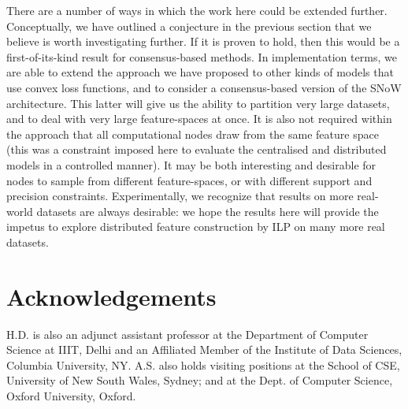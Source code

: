 There are a number of ways in which the work here could be extended further.
Conceptually, we have outlined a conjecture in the previous section
that we believe is worth investigating further. If it is proven to hold, then
this would be a first-of-its-kind result for consensus-based methods. In implementation
terms, we are able to extend the approach we have proposed to other kinds of models
that use convex loss functions, and to consider a consensus-based version of the
SNoW architecture. This latter will give us the ability to partition very large datasets,
and to deal with very large feature-spaces at once. It is also not required within the
approach that all computational nodes draw from the same feature space (this was a constraint
imposed here to evaluate the centralised and distributed models in a controlled manner). It may
be both interesting and desirable for nodes to sample from different feature-spaces, or with
different support and precision constraints. 
Experimentally, we recognize that
results on more real-world datasets are always desirable: we hope the results here will
provide the impetus to explore distributed feature construction by ILP on many more real datasets. 


\section*{Acknowledgements}

H.D. is also an adjunct assistant professor at the Department of Computer Science at IIIT, Delhi and an Affiliated Member of the Institute of Data Sciences, Columbia University, NY. A.S. also holds visiting positions at the School of CSE, University of New South Wales, Sydney; and at the Dept. of Computer Science, Oxford University, Oxford.

%

